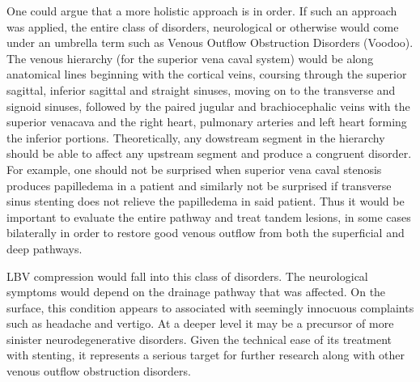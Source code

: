 \documentclass{article}
\begin{document}
One could argue that a more holistic approach is in order.
If such an approach was applied, the entire class of disorders, neurological or otherwise would come under an umbrella term such as Venous Outflow Obstruction Disorders (Voodoo).
The venous hierarchy (for the superior vena caval system) would be along anatomical lines beginning with the cortical veins, coursing through the superior sagittal, inferior sagittal and straight sinuses, moving on to the transverse and signoid sinuses, followed by the paired jugular and brachiocephalic veins with the superior venacava and the right heart, pulmonary arteries and left heart forming the inferior portions.
Theoretically, any dowstream segment in the hierarchy should be able to affect any upstream segment and produce a congruent disorder.
For example, one should not be surprised when superior vena caval stenosis produces papilledema in a patient and similarly not be surprised if transverse sinus stenting does not relieve the papilledema in said patient.
Thus it would be important to evaluate the entire pathway and treat tandem lesions, in some cases bilaterally in order to restore good venous outflow from both the superficial and deep pathways.

LBV compression would fall into this class of disorders. The neurological symptoms would depend on the drainage pathway that was affected.
On the surface, this condition  appears to associated with seemingly innocuous complaints such as headache and vertigo.
At a deeper level it may be a precursor of more sinister neurodegenerative disorders.
Given the technical ease of its treatment with stenting, it represents a serious target for further research along with other venous outflow obstruction disorders.
\end{document}
